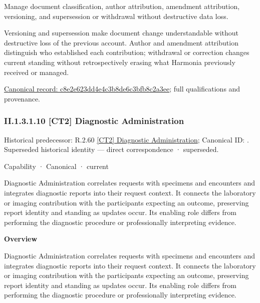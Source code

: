 Manage document classification, author attribution, amendment attribution, versioning, and supersession or withdrawal without destructive data loss.



Versioning and supersession make document change understandable without destructive loss of the previous account. Author and amendment attribution distinguish who established each contribution; withdrawal or correction changes current standing without retrospectively erasing what Harmonia previously received or managed.


{\footnotesize \href{../../../../continuum/strategy/capability/feature/c8e2e623dd4e4c3b8de6c3bfb8c2a3ee.md}{Canonical record: c8e2e623dd4e4c3b8de6c3bfb8c2a3ee}; full qualifications and provenance.}\par
\subsubsection*{II.1.3.1.10 [CT2] Diagnostic Administration}
\label{navigation:II.1.3.1.10}

{\small Historical predecessor: R.2.60 \hyperref[element:2b1a27d5d9944e05b4cf0fcaad4ca433]{[CT2] Diagnostic Administration}; Canonical ID: \texttt{}. Superseded historical identity — direct correspondence · superseded.}\par
\label{element:3cc720ba2e8b4d7a94bb349391d61895}
{\small Capability · Canonical · current}\par

Diagnostic Administration correlates requests with specimens and encounters and integrates diagnostic reports into their request context. It connects the laboratory or imaging contribution with the participants expecting an outcome, preserving report identity and standing as updates occur. Its enabling role differs from performing the diagnostic procedure or professionally interpreting evidence.



\textbf{Overview}



Diagnostic Administration correlates requests with specimens and encounters and integrates diagnostic reports into their request context. It connects the laboratory or imaging contribution with the participants expecting an outcome, preserving report identity and standing as updates occur. Its enabling role differs from performing the diagnostic procedure or professionally interpreting evidence.



